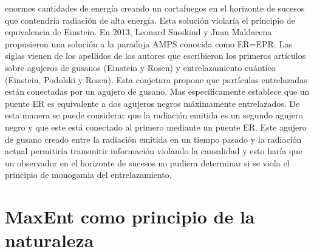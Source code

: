 \documentclass{article}
\theoremstyle{plain}
\theoremstyle{definition}
\begin{document}
enormes cantidades de energía creando un cortafuegos en el horizonte de sucesos que contendría radiación de alta energía. Esta solución violaría el principio de equivalencia de Einstein. En 2013, Leonard Susskind y Juan Maldacena propusieron una solución a la paradoja AMPS conocida como ER=EPR\cite{Maldacena:2013xja}. Las siglas vienen de los apellidos de los autores que escribieron los primeros artículos sobre agujeros de gusanos\cite{Rosen_1935PhRv} (Einstein y Rosen) y entrelazamiento cuántico\cite{Einstein:1935rr} (Einstein, Podolski y Rosen). Esta conjetura propone que partículas entrelazadas están conectadas por un agujero de gusano. Mas específicamente establece que un puente ER es equivalente a dos agujeros negros máximamente entrelazados. De esta manera se puede considerar que la radiación emitida es un segundo agujero negro y que este está conectado al primero mediante un puente ER. Este agujero de gusano creado entre la radiación emitida en un tiempo pasado y la radiación actual permitiría transmitir información violando la causalidad y esto haría que un observador en el horizonte de sucesos no pudiera determinar si se viola el principio de monogamia del entrelazamiento.  \par
	\section{MaxEnt como principio de la naturaleza}
\end{document}
